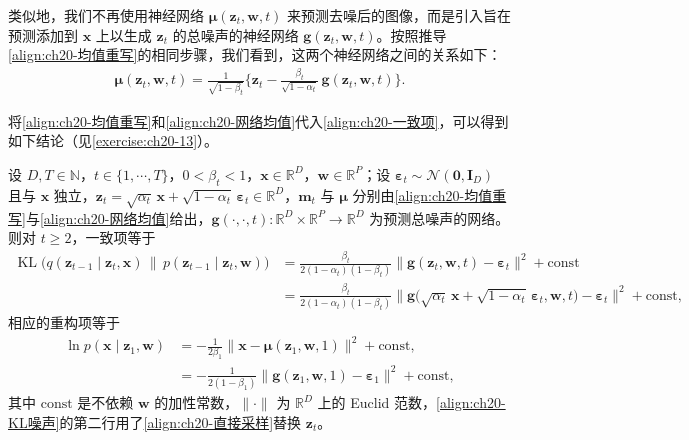 \documentclass[../../main.tex]{subfiles}
\begin{document}
类似地，我们不再使用神经网络 $\bm{\mu}(\bm{z}_t,\bm{w},t)$ 来预测去噪后的图像，而是引入旨在预测添加到 $\bm{x}$ 上以生成 $\bm{z}_t$ 的总噪声的神经网络 $\bm{g}(\bm{z}_t,\bm{w},t)$。按照推导\eqref{align:ch20-均值重写}的相同步骤，我们看到，这两个神经网络之间的关系如下：
\begin{align}
\bm{\mu}(\bm{z}_t,\bm{w},t)=\frac{1}{\sqrt{1-\beta_t}}\Big\{\bm{z}_t-\frac{\beta_t}{\sqrt{1-\alpha_t}}\,\bm{g}(\bm{z}_t,\bm{w},t)\Big\}.
\label{align:ch20-网络均值}
\end{align}

将\eqref{align:ch20-均值重写}和\eqref{align:ch20-网络均值}代入\eqref{align:ch20-一致项}，可以得到如下结论（见\cref{exercise:ch20-13}）。

\begin{proposition}[噪声预测损失]\label{proposition:ch20-噪声预测损失}
设 $D,T\in\mathbb{N}$，$t\in\{1,\cdots,T\}$，$0<\beta_t<1$，$\bm{x}\in\mathbb{R}^{D}$，$\bm{w}\in\mathbb{R}^{P}$；设 $\bm{\varepsilon}_t\sim\mathcal{N}(\bm{0},\bm{I}_{D})$ 且与 $\bm{x}$ 独立，$\bm{z}_t=\sqrt{\alpha_t}\,\bm{x}+\sqrt{1-\alpha_t}\,\bm{\varepsilon}_t\in\mathbb{R}^{D}$，$\bm{m}_t$ 与 $\bm{\mu}$ 分别由\eqref{align:ch20-均值重写}与\eqref{align:ch20-网络均值}给出，$\bm{g}(\cdot,\cdot,t):\mathbb{R}^{D}\times\mathbb{R}^{P}\to\mathbb{R}^{D}$ 为预测总噪声的网络。则对 $t\geqslant2$，一致项等于
\begin{align}
\operatorname{KL}\big(q(\bm{z}_{t-1}\mid\bm{z}_t,\bm{x})\,\|\,p(\bm{z}_{t-1}\mid\bm{z}_t,\bm{w})\big)&=\frac{\beta_t}{2(1-\alpha_t)(1-\beta_t)}\big\|\bm{g}(\bm{z}_t,\bm{w},t)-\bm{\varepsilon}_t\big\|^2+\mathrm{const}\nonumber\\
&=\frac{\beta_t}{2(1-\alpha_t)(1-\beta_t)}\big\|\bm{g}\big(\sqrt{\alpha_t}\,\bm{x}+\sqrt{1-\alpha_t}\,\bm{\varepsilon}_t,\bm{w},t\big)-\bm{\varepsilon}_t\big\|^2+\mathrm{const},
\label{align:ch20-KL噪声}
\end{align}
相应的重构项等于
\begin{align}
\ln p(\bm{x}\mid\bm{z}_1,\bm{w})&=-\frac{1}{2\beta_1}\big\|\bm{x}-\bm{\mu}(\bm{z}_1,\bm{w},1)\big\|^2+\mathrm{const},
\label{align:ch20-重构项}\\
&=-\frac{1}{2(1-\beta_1)}\big\|\bm{g}(\bm{z}_1,\bm{w},1)-\bm{\varepsilon}_1\big\|^2+\mathrm{const},
\label{align:ch20-重构噪声}
\end{align}
其中 $\mathrm{const}$ 是不依赖 $\bm{w}$ 的加性常数，$\|\cdot\|$ 为 $\mathbb{R}^{D}$ 上的 Euclid 范数，\eqref{align:ch20-KL噪声}的第二行用了\eqref{align:ch20-直接采样}替换 $\bm{z}_t$。
\end{proposition}
\end{document}
